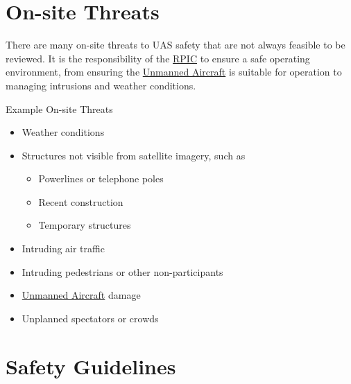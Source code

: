 \documentclass[
]{book}
\providecommand{\tightlist}{%
  \setlength{\itemsep}{0pt}\setlength{\parskip}{0pt}}
\begin{document}
\hypertarget{ss-on-site-threats}{%
\section{On-site Threats}\label{ss-on-site-threats}}

There are many on-site threats to UAS safety that are not always feasible to be reviewed. It is the responsibility of the \protect\hyperlink{RPIC}{RPIC} to ensure a safe operating environment, from ensuring the \protect\hyperlink{UA}{Unmanned Aircraft} is suitable for operation to managing intrusions and weather conditions.

Example On-site Threats

\begin{itemize}
\item
  Weather conditions
\item
  Structures not visible from satellite imagery, such as

  \begin{itemize}
  \tightlist
  \item
    Powerlines or telephone poles
  \item
    Recent construction
  \item
    Temporary structures
  \end{itemize}
\item
  Intruding air traffic
\item
  Intruding pedestrians or other non-participants
\item
  \protect\hyperlink{UA}{Unmanned Aircraft} damage
\item
  Unplanned spectators or crowds
\end{itemize}

\hypertarget{s-safety-guidelines}{%
\section{Safety Guidelines}\label{s-safety-guidelines}}
\end{document}
